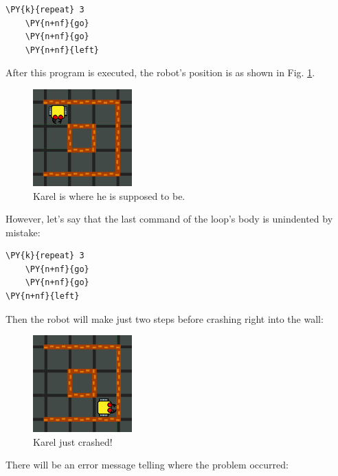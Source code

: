 \begin{bbox}
\begin{Verbatim}[commandchars=\\\{\}]
\PY{k}{repeat} 3
    \PY{n+nf}{go}
    \PY{n+nf}{go}
    \PY{n+nf}{left}
\end{Verbatim}
\end{bbox}
\vspace{6mm}

\noindent
After this program is executed, the robot's position is 
as shown in Fig. \ref{fig:repeat-12}.

\begin{figure}[!ht]
\begin{center}
\includegraphics[width=3.8cm]{img/repeat-12.png}
\vspace{-0mm}
\caption{Karel is where he is supposed to be.}
\label{fig:repeat-12}
\end{center}
\end{figure}
\noindent
However, let's say that the last command of the loop's body is
unindented by mistake:

\begin{bbox}
\begin{Verbatim}[commandchars=\\\{\}]
\PY{k}{repeat} 3
    \PY{n+nf}{go}
    \PY{n+nf}{go}
\PY{n+nf}{left}
\end{Verbatim}
\end{bbox}
\vspace{6mm}

\noindent
Then the robot will make just two steps before crashing right into the wall:

\begin{figure}[!ht]
\begin{center}
\includegraphics[width=3.8cm]{img/repeat-13.png}
\vspace{-0mm}
\caption{Karel just crashed!}
\label{fig:repeat-13}
\end{center}
\end{figure}
\noindent
There will be an error message telling where the problem occurred:\\

